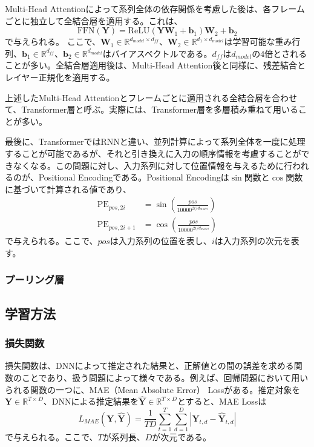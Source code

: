 \documentclass[12pt]{jarticle}
\numberwithin{equation}{section}    %
\numberwithin{figure}{section}      %
\numberwithin{table}{section}      %
\begin{document}
Multi-Head Attentionによって系列全体の依存関係を考慮した後は、各フレームごとに独立して全結合層を適用する。これは、
\begin{equation}
    \text{FFN}(\bm{Y}) = \text{ReLU}(\bm{Y}\bm{W}_{1} + \bm{b}_{1})\bm{W}_{2} + \bm{b}_{2}
\end{equation}
で与えられる。
ここで、$\bm{W}_{1} \in \mathbb{R}^{d_{model} \times d_{ff}}$、$\bm{W}_{2} \in \mathbb{R}^{d_{1} \times d_{model}}$は学習可能な重み行列、$\bm{b}_{1} \in \mathbb{R}^{d_{ff}}$、$\bm{b}_{2} \in \mathbb{R}^{d_{model}}$はバイアスベクトルである。$d_{ff}$は$d_{model}$の4倍とされることが多い。全結合層適用後は、Multi-Head Attention後と同様に、残差結合とレイヤー正規化を適用する。

上述したMulti-Head Attentionとフレームごとに適用される全結合層を合わせて、Transformer層と呼ぶ。実際には、Transformer層を多層積み重ねて用いることが多い。

最後に、TransformerではRNNと違い、並列計算によって系列全体を一度に処理することが可能であるが、それと引き換えに入力の順序情報を考慮することができなくなる。この問題に対し、入力系列に対して位置情報を与えるために行われるのが、Positional Encodingである。Positional Encodingは$\sin$関数と$\cos$関数に基づいて計算される値であり、
\begin{align}
    \text{PE}_{pos, 2i}     & = \sin \left(\frac{pos}{10000^{2i / d_{model}}}\right) \\
    \text{PE}_{pos, 2i + 1} & = \cos \left(\frac{pos}{10000^{2i / d_{model}}}\right)
\end{align}
で与えられる。ここで、$pos$は入力系列の位置を表し、$i$は入力系列の次元を表す。

\subsubsection{プーリング層}

\subsection{学習方法}
\subsubsection{損失関数}
損失関数は、DNNによって推定された結果と、正解値との間の誤差を求める関数のことであり、扱う問題によって様々である。例えば、回帰問題において用いられる関数の一つに、MAE（Mean Absolute Error） Lossがある。推定対象を$\bm{Y} \in \mathbb{R}^{T \times D}$、DNNによる推定結果を$\hat{\bm{Y}} \in \mathbb{R}^{T \times D}$とすると、MAE Lossは
\begin{equation}
    L_{MAE}(\bm{Y}, \hat{\bm{Y}}) = \frac{1}{TD} \sum_{t = 1}^{T} \sum_{d = 1}^{D}  |\bm{Y}_{t, d} - \hat{\bm{Y}}_{t, d}|
\end{equation}
で与えられる。ここで、$T$が系列長、$D$が次元である。
\end{document}
